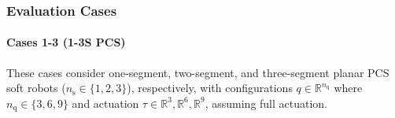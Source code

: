 



\subsubsection{Evaluation Cases}
\paragraph{Cases 1-3 (1-3S PCS)}
These cases consider one-segment, two-segment, and three-segment planar \gls{PCS} soft robots ($n_\mathrm{s} \in \{ 1, 2, 3 \}$), respectively, with configurations $q \in \mathbb{R}^{n_\mathrm{q}}$ where $n_\mathrm{q} \in \{3, 6, 9 \}$ and actuation  $\tau \in \mathbb{R}^3, \mathbb{R}^6, \mathbb{R}^9$, assuming full actuation.

